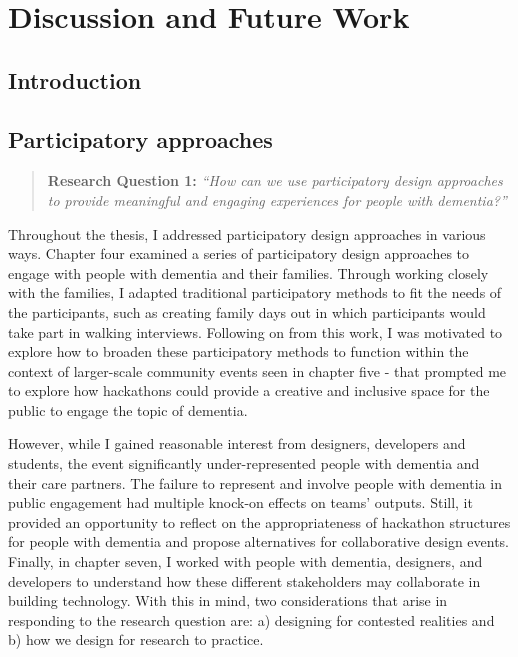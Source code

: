 

\chapter{Discussion and Future Work}
\label{Discussion}

\section{Introduction}
\label{Discussion:Intro}

\section{Participatory approaches}
\label{Discussion:RQ1}
\begin{quote}
\textbf{    Research Question 1:
}    
\textit{    “How can we use participatory design approaches to provide meaningful and engaging experiences for people with dementia?”}
\end{quote}

Throughout the thesis, I addressed participatory design approaches in various ways. Chapter four examined a series of participatory design approaches to engage with people with dementia and their families. Through working closely with the families, I adapted traditional participatory methods to fit the needs of the participants, such as creating family days out in which participants would take part in walking interviews. Following on from this work, I was motivated to explore how to broaden these participatory methods to function within the context of larger-scale community events seen in chapter five - that prompted me to explore how hackathons could provide a creative and inclusive space for the public to engage the topic of dementia. 

However, while I gained reasonable interest from designers, developers and students, the event significantly under-represented people with dementia and their care partners. The failure to represent and involve people with dementia in public engagement had multiple knock-on effects on teams' outputs. Still, it provided an opportunity to reflect on the appropriateness of hackathon structures for people with dementia and propose alternatives for collaborative design events. Finally, in chapter seven, I worked with people with dementia, designers, and developers to understand how these different stakeholders may collaborate in building technology. With this in mind, two considerations that arise in responding to the research question are: a) designing for contested realities and b) how we design for research to practice.

